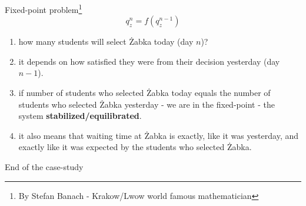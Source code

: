 \documentclass{beamer}
\begin{document}
\begin{frame}{Fixed-point problem\footnote{By Stefan Banach - Krakow/Lwow world famous mathematician}}{}
\begin{equation*}
q_z^n=f(q_z^{n-1})
\end{equation*}
\begin{enumerate}
\item how many students will select \.{Z}abka today (day $n$)? 
\item it depends on how satisfied they were from their decision yesterday (day $n-1$).
\item if number of students who selected \.{Z}abka today equals the number of students who selected \.{Z}abka yesterday - we are in the fixed-point - the system \textbf{stabilized/equilibrated}.
\item it also means that waiting time at \.{Z}abka is exactly, like it was yesterday, and exactly like it was expected by the students who selected \.{Z}abka.
\end{enumerate}
\end{frame}

\begin{frame}{End of the case-study}
\end{frame}
\end{document}
